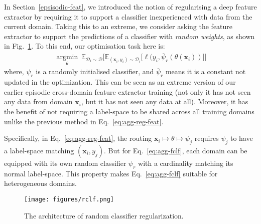 \documentclass[10pt,twocolumn,letterpaper]{article}
\begin{document}
In Section~\ref{epsisodic-feat}, we introduced the notion of regularising a deep feature extractor by requiring it to support a classifier inexperienced with data from the current domain. Taking this to an extreme, we consider asking the feature extractor to support the predictions of a classifier with \emph{random weights}, as shown in Fig.~\ref{fig:agg-fclf}. To this end, our optimisation task here is:
\begin{equation}
\begin{aligned}
\label{eq:agg-fclf}
\underset{\theta}{\operatorname{argmin}}~
\mathbb{E}_{\mathcal{D}_i\sim\mathcal{D}} \big[ \mathbb{E}_{(\mathbf{x}_i,y_i)\sim \mathcal{D}_i} \big[  \ell(y_i, \overline{\psi}_r(\theta(\mathbf{x}_i)) \big] \big]
\end{aligned}
\end{equation}
\noindent where, $\psi_r$ is a randomly initialised classifier, and $\overline{\psi}_r$ means it is a constant not updated in the optimization. This can be seen as an extreme version of our earlier episodic cross-domain feature extractor training (not only it has not seen any data from domain $\mathbf{x}_i$, but it has not seen any data at all). Moreover, it has the benefit of not requiring a label-space to be shared across all training domains unlike the previous method in Eq.~\ref{eq:agg-reg-feat}. 

Specifically, in Eq.~\ref{eq:agg-reg-feat}, the routing $\mathbf{x}_i \mapsto \theta \mapsto \psi_j$ requires $\psi_j$ to have a label-space matching $(\mathbf{x}_i,y_j)$. But for Eq.~\ref{eq:agg-fclf}, each domain can be equipped with its own random classifier $\psi_r$ with a cardinality matching its normal label-space. This property makes Eq.~\ref{eq:agg-fclf} suitable for heterogeneous domains.





\begin{figure}[tb]
    \centering
    \texttt{[image: figures/rclf.png]}
    \vspace{-0.4cm}
    \caption{\small The architecture of random classifier regularization.}
    \label{fig:agg-fclf}
        \vspace{-0.3cm}
\end{figure}
\end{document}
